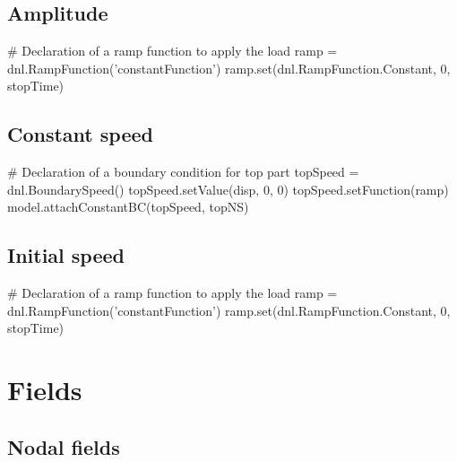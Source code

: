\subsection{Amplitude}

\begin{PythonListing}
# Declaration of a ramp function to apply the load
ramp = dnl.RampFunction('constantFunction')
ramp.set(dnl.RampFunction.Constant, 0, stopTime)
\end{PythonListing}

\subsection{Constant speed}

\begin{PythonListing}
# Declaration of a boundary condition for top part
topSpeed = dnl.BoundarySpeed()
topSpeed.setValue(disp, 0, 0)
topSpeed.setFunction(ramp)
model.attachConstantBC(topSpeed, topNS)
\end{PythonListing}

\subsection{Initial speed}

\begin{PythonListing}
# Declaration of a ramp function to apply the load
ramp = dnl.RampFunction('constantFunction')
ramp.set(dnl.RampFunction.Constant, 0, stopTime)
\end{PythonListing}

\section{Fields}\label{ProgrammingLanguage:Section:Fields}

\subsection{Nodal fields}

